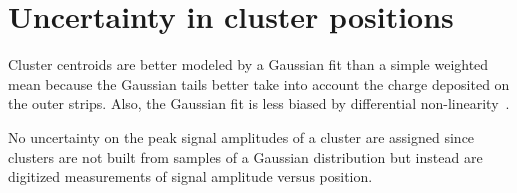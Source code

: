 

\chapter[Cluster position uncertainty]{Uncertainty in cluster positions}
\label{appendix:clustering}





Cluster centroids are better modeled by a Gaussian fit than a simple weighted mean because the Gaussian tails better take into account the charge deposited on the outer strips. Also, the Gaussian fit is less biased by differential non-linearity~\cite{lefebvre_thesis}. 

No uncertainty on the peak signal amplitudes of a cluster are assigned since clusters are not built from samples of a Gaussian distribution but instead are digitized measurements of signal amplitude versus position.

